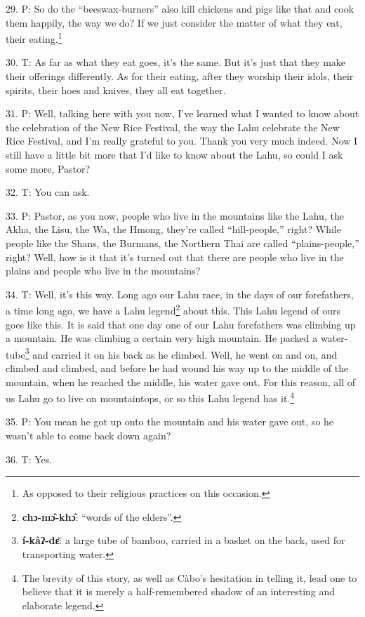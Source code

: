 29. P: So do the ``beeswax-burners'' also kill chickens and pigs
like that and cook them happily, the way we do? If we just consider the matter
of what they eat, their eating.\footnote{As opposed to their religious practices on this occasion.}

30. T: As far as what they eat goes, it's the same. But it's just that they make
their offerings differently. As for their eating, after they worship their idols,
their spirits, their hoes and knives, they all eat together.

31. P: Well, talking here with you now, I've learned what I wanted to know about
the celebration of the New Rice Festival, the way the Lahu celebrate the New Rice
Festival, and I'm really grateful to you. Thank you very much indeed. Now I still
have a little bit more that I'd like to know about the Lahu, so could I ask some
more, Pastor?

32. T: You can ask.

33. P: Pastor, as you now, people who live in the mountains like the Lahu, the Akha,
the Lisu, the Wa, the Hmong, they're called ``hill-people,'' right?
While people like the Shans, the Burmans, the Northern Thai are called ``plains-people,''
right? Well, how is it that it's turned out that there are people who live in the
plains and people who live in the mountains?

34. T: Well, it's this way. Long ago our Lahu race, in the days of our forefathers,
a time long ago, we have a Lahu legend\footnote{\textbf{chɔ-mɔ̂-khɔ̂}: ``words of the elders''.} about this. This Lahu legend of ours
goes like this. It is said that one day one of our Lahu forefathers was climbing
up a mountain. He was climbing a certain very high mountain. He packed a water-tube\footnote{\textbf{í-kâʔ-dɛ̄}: a large tube of bamboo, carried in a basket on the back, used for transporting water.}
and carried it on his back as he climbed. Well, he went on and on, and climbed
and climbed, and before he had wound his way up to the middle of the mountain,
when he reached the middle, his water gave out. For this reason, all of us Lahu
go to live on mountaintops, or so this Lahu legend has it.\footnote{The brevity of this story, as well as Càbo's hesitation in telling it, lead one to believe that it is merely a half-remembered shadow of an interesting and elaborate legend.}

35. P: You mean he got up onto the mountain and his water gave out, so he wasn't
able to come back down again?

36. T: Yes.

